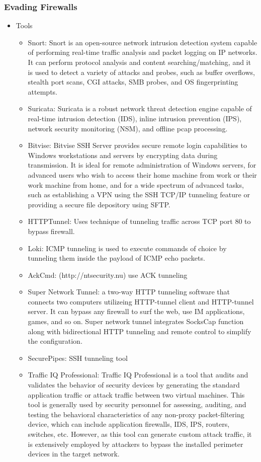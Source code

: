 \subsubsection{Evading Firewalls}
\begin{itemize}
    \item Tools
    \begin{itemize}
        \item Snort: Snort is an open-source network intrusion detection system capable of performing real-time traffic analysis and packet logging on IP networks. It can perform protocol analysis and content searching/matching, and it is used to detect a variety of attacks and probes, such as buffer overflows, stealth port scans, CGI attacks, SMB probes, and OS fingerprinting attempts.
        \item Suricata: Suricata is a robust network threat detection engine capable of real-time intrusion detection (IDS), inline intrusion prevention (IPS), network security monitoring (NSM), and offline pcap processing.
        \item Bitvise: Bitvise SSH Server provides secure remote login capabilities to Windows workstations and servers by encrypting data during transmission. It is ideal for remote administration of Windows servers, for advanced users who wish to access their home machine from work or their work machine from home, and for a wide spectrum of advanced tasks, such as establishing a VPN using the SSH TCP/IP tunneling feature or providing a secure file depository using SFTP.
        \item HTTPTunnel: Uses technique of tunneling traffic across TCP port 80 to bypass firewall.
        \item Loki: ICMP tunneling is used to execute commands of choice by tunneling them inside the payload of ICMP echo packets.
        \item AckCmd: (http://ntsecurity.nu) use ACK tunneling
        \item Super Network Tunnel: a two-way HTTP tunneling software that connects two computers utilizeing HTTP-tunnel client and HTTP-tunnel server. It can bypass any firewall to surf the web, use IM applications, games, and so on. Super network tunnel integrates SocksCap function along with  bidirectional HTTP tunneling and remote control to simplify the configuration.
        \item SecurePipes: SSH tunneling tool
        \item Traffic IQ Professional: Traffic IQ Professional is a tool that audits and validates the behavior of security devices by generating the standard application traffic or attack traffic between two virtual machines. This tool is generally used by security personnel for assessing, auditing, and testing the behavioral characteristics of any non-proxy packet-filtering device, which can include application firewalls, IDS, IPS, routers, switches, etc. However, as this tool can generate custom attack traffic, it is extensively employed by attackers to bypass the installed perimeter devices in the target network.

\end{itemize}
\end{itemize}

